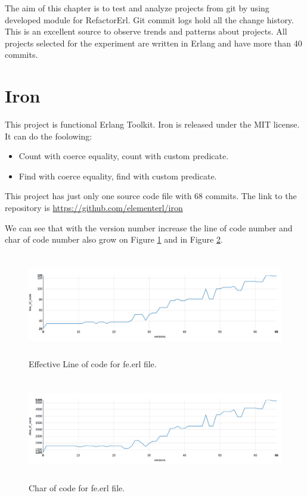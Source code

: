 The aim of this chapter is to test and analyze projects from git by using developed module for RefactorErl. Git commit logs hold all the change history. This is an excellent source to observe trends and patterns about projects. All projects selected for the experiment are written in Erlang and have more than 40 commits.

\section{Iron}

This project is functional Erlang Toolkit. Iron is released under the MIT license. It can do the foolowing:
\begin{itemize}
	\item Count with coerce equality, count with custom predicate.
	\item Find with coerce equality, find with custom predicate.
\end{itemize}

This project has just only one source code file with 68 commits. The link to the repository is \url{https://github.com/elementerl/iron}

We can see that with the version number increase the line of code number and char of code number also grow on Figure \ref{fig:loc_iron} and in Figure \ref{fig:char_iron}.

\begin{figure}[h]
	\centering
	\includegraphics[height=45mm]{figures/loc_iron.png}
	\caption{Effective Line of code for fe.erl file.}
	\label{fig:loc_iron}
\end{figure}

\begin{figure}[h]
	\centering
	\includegraphics[height=45mm]{figures/char_iron.png}
	\caption{Char of code for fe.erl file.}
	\label{fig:char_iron}
\end{figure}

